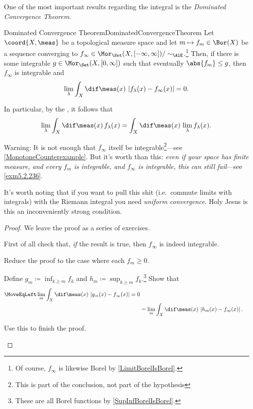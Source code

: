 One of the most important results regarding the integral is the \emph{Dominated Convergence Theorem}.
\begin{thm}{Dominated Convergence Theorem}{DominatedConvergenceTheorem}
Let $\coord{X,\meas}$ be a topological measure space and let $m\mapsto f_m\in \Bor (X)$ be a sequence converging to $f_\infty \in \Mor _{\Set}(X,[-\infty ,\infty ])/\sim _{\AlE}$.\footnote{Of course, $f_{\infty}$ is likewise Borel by \cref{LimitBorelIsBorel}.}  Then, if there is some integrable $g\in \Mor _{\Set}(X,[0,\infty ])$ such that eventually $\abs{f_m}\leq g$, then $f_\infty$ is integrable and
\begin{equation}
\lim _\lambda \int _X\dif \meas (x)\, \left| f_\lambda (x)-f_\infty (x)\right| =0.
\end{equation}
\begin{rmk}
In particular, by the , it follows that
\begin{equation}
\lim _\lambda \int _X\dif \meas (x)\, f_\lambda (x)=\int _X\dif \meas (x)\, \lim _\lambda f_\lambda (x).
\end{equation}
\end{rmk}
\begin{wrn}
Warning:  It is not enough that $f_\infty$ itself be integrable\footnote{This is part of the conclusion, not part of the hypothesis}---see \cref{MonotoneCounterexample}.  But it's worth than this:  \emph{even if your space has finite measure, and every $f_m$ is integrable, and $f_\infty$ is integrable, this can still fail}---see \cref{exm5.2.236}.
\end{wrn}
\begin{rmk}
It's worth noting that if you want to pull this shit (i.e.\ commute limits with integrals) with the Riemann integral you need \emph{uniform convergence}.  Holy Jesus is this an inconveniently strong condition.
\end{rmk}
\begin{proof}
We leave the proof as a series of exercises.
\begin{exr}{}{}
First of all check that, \emph{if} the result is true, then $f_\infty$ is indeed integrable.
\end{exr}
\begin{exr}{}{}
Reduce the proof to the case where each $f_m\geq 0$.
\end{exr}
\begin{exr}[breakable=false]{}{}
Define $g_m\coloneqq \inf _{k\geq m}f_k$ and $h_m\coloneqq \sup _{k\geq m}f_k$.\footnote{These are all Borel functions by \cref{SupInfBorelIsBorel}.}  Show that
\begin{equation}
\begin{split}
\MoveEqLeft
\lim _m\int _X\dif \meas (x)\, \left| g_m(x)-f_\infty (x)\right| =0 \\
& =\lim _m\int _X\dif \meas (x)\, \left| h_m(x)-f_\infty (x)\right| .
\end{split}
\end{equation}
\end{exr}
\begin{exr}{}{}
Use this to finish the proof.
\end{exr}
\end{proof}
\end{thm}

